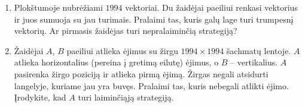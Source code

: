 \begin{enumerate}
\item Plokštumoje nubrėžiami $1994$ vektoriai. Du žaidėjai paeiliui renkasi
  vektorius ir juos sumuoja su jau turimais. Pralaimi tas, kuris galų lage
  turi trumpesnį vektorių. Ar pirmasis žaidėjas turi nepralaiminčią
  strategiją?


\item {} Žaidėjai $A$, $B$ paeiliui atlieka ėjimus su
  žirgu  $1994\times 1994$ šachmatų lentoje. $A$ atlieka horizontalius (pereina
  į gretimą eilutę) ėjimus, o $B$ – vertikalius. $A$ pasirenka žirgo poziciją
  ir atlieka pirmą ėjimą. Žirgas negali atsidurti langelyje, kuriame jau
  yra buvęs. Pralaimi tas, kuris nebegali atlikti ėjimo. Įrodykite, kad $A$
  turi laiminčiąją strategiją.

%


\end{enumerate}
